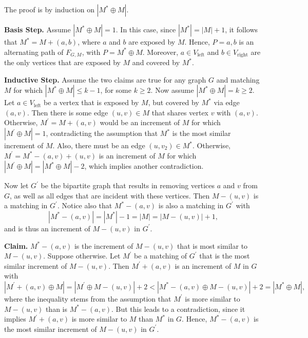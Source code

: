 \documentclass [12pt]{article}
\theoremstyle{definition}
\begin{document}
The proof is by induction on $|M^{*}\oplus M|$.

\textbf{Basis Step.} Assume $|M^{*}\oplus M|=1$. In this case, since  $|M^{*}|=|M|+1$, it follows that $M^{*}=M+(a,b)$, where $a$ and $b$ are exposed by $M$. Hence, $P=a,b$ is an alternating path
of  $F_{G,M}$, with $P=M^{*}\oplus M$. Moreover, $a\in V_{\mbox{left}}$ and $b\in V_{\mbox{right}}$ are the only vertices that are exposed by $M$ and covered by $M^{*}$.

\textbf{Inductive Step.}  Assume the two claims are true for any graph $G$ and matching $M$ for which $|M^{*}\oplus M| \leq k-1$, for some $k\geq 2$. Now assume 
 $|M^{*}\oplus M| = k\geq 2$. Let $a\in V_{\mbox{left}}$ be a vertex that is exposed by $M$, but covered by $M^{*}$ via edge $(a,v)$. Then there is some edge $(u,v)\in M$ that shares vertex $v$ with $(a,v)$.
 Otherwise, $M^{\prime}=M+(a,v)$ would be an increment of $M$ for which  $|M^{\prime}\oplus M|=1$, contradicting the assumption that $M^{*}$ is the most similar increment of $M$. Also, there must
 be an edge $(u,v_2)\in M^{*}$. Otherwise, $M^{\prime}=M^{*}-(a,v)+(u,v)$ is an increment of $M$ for which $|M^{\prime}\oplus M|=|M^{*}\oplus M|-2$, which implies another contradiction.
 
Now let $G^{\prime}$ be the bipartite graph that results in removing vertices $a$ and $v$ from $G$, as well as all edges that are incident with these vertices. Then $M-(u,v)$ is a matching in  $G^{\prime}$. Notice also that $M^{*}-(a,v)$ is also a matching in $G^{\prime}$ with  
\[|M^{*}-(a,v)| = |M^{*}|-1 = |M| = |M-(u,v)| + 1,\]
and is thus
an increment of 
 $M-(u,v)$ in $G^{\prime}$.
 
\textbf{Claim.} $M^{*}-(a,v)$ is the increment of  $M-(u,v)$ that is most similar to  $M-(u,v)$. Suppose otherwise. Let $M^{\prime}$ be a matching of $G^{\prime}$ that is the most similar increment of
 $M-(u,v)$. Then $M^{\prime}+(a,v)$ is an increment of $M$ in $G$ with
 \[|M^{\prime}+(a,v)\oplus M| = |M^{\prime}\oplus M-(u,v)| + 2 <  |M^{*}-(a,v)\oplus M-(u,v)| + 2 = |M^{*}\oplus M|,\]
 where the inequality stems from the assumption that  $M^{\prime}$ is more similar to  $M-(u,v)$ than is $M^{*}-(a,v)$. But this leads to a contradiction, since it implies 
 $M^{\prime}+(a,v)$ is more similar to $M$ than $M^{*}$ in $G$. Hence,  $M^{*}-(a,v)$ is the most similar increment of  $M-(u,v)$  in $G^{\prime}$.
 
\end{document}
